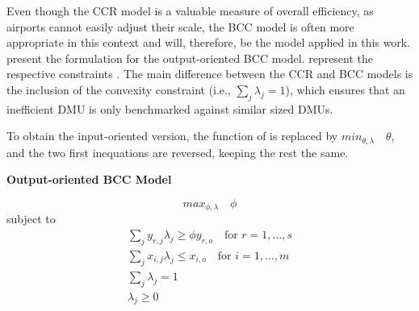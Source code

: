 Even though the CCR model is a valuable measure of overall efficiency, as airports cannot easily adjust their scale, the BCC model is often more appropriate in this context and will, therefore, be the model applied in this work.  present the formulation for the output-oriented BCC model.  represent the respective constraints . The main difference between the CCR and BCC models is the inclusion of the convexity constraint (i.e., \(\sum_j \lambda_j = 1\)), which ensures that an inefficient DMU is only benchmarked against similar sized DMUs. 


To obtain the input-oriented version, the function of  is replaced by \(min_{\theta,\lambda} \quad \theta\), and the two first inequations are reversed, keeping the rest the same.

\clearpage
\vspace{-0.4cm}
\begin{center}
\textbf{Output-oriented BCC Model}
\end{center}
\begin{equation}
    \label{output_dea}
max_{\phi,\lambda} \quad \phi
\end{equation}
subject to
\begin{equation}
\label{eq:bcc_constraints_output}
\begin{gathered}
\sum_j y_{r,j} \lambda_j \geq \phi y_{r,o} \quad \text{for } r=1,\ldots,s \\
\sum_j x_{i,j}\lambda_j \leq x_{i,o} \quad \text{for } i=1,\ldots,m \\
\sum_j \lambda_j = 1 \\
\lambda_j \geq 0
\end{gathered}
\end{equation}
\vspace{-0.4cm}


